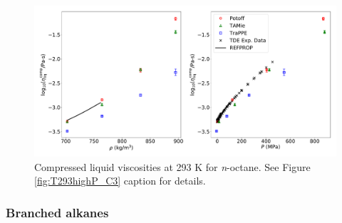 \documentclass[preprint,review,12pt]{elsarticle}
\begin{document}
	\begin{figure}[htb!]
		\centering
		\includegraphics[width=6.4in]{compare_REFPROP_T293highP_C8H18.pdf}
		\caption{Compressed liquid viscosities at 293 K for \textit{n}-octane. See Figure \ref{fig:T293highP_C3} caption for details.}
		\label{fig:T293highP_C8}
	\end{figure} 
	
	
	
	\subsubsection{Branched alkanes}
	
	
	
\end{document}
